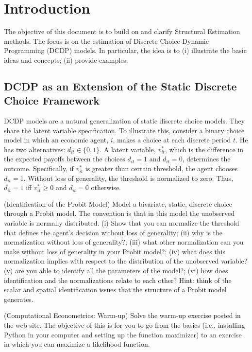 \section{Introduction} \label{section:intro}
\noindent The objective of this document is to build on \citet{keane2011structural} and clarify Structural Estimation methods. The focus is on the estimation of Discrete Choice Dynamic Programming (DCDP) models. In particular, the idea is to (i) illustrate the basic ideas and concepts; (ii) provide examples.\\

\subsection{DCDP as an Extension of the Static Discrete Choice Framework} \label{section:extension}
DCDP models are a natural generalization of static discrete choice models. They share the latent variable specification. To illustrate this, consider a binary choice model in which an economic agent, $i$, makes a choice at each discrete period $t$. He has two alternatives: $d_{it} \in \{ 0,1\}$. A latent variable, $v_{it}^*$, which is the difference in the expected payoffs between the choices $d_{it} = 1$ and $d_{it} = 0$, determines the outcome. Specifically, if $v_{it}^*$ is greater than certain threshold, the agent chooses $d_{it} = 1$. Without loss of generality, the threshold is normalized to zero. Thus, $d_{it} = 1$ iff $v_{it}^* \geq 0$ and $d_{it} = 0$ otherwise.\\
\begin{exercise} (Identification of the Probit Model) \label{exercise:idenprobit}
Model a bivariate, static, discrete choice through a Probit model. The convention is that in this model the unobserved variable is normally distributed. (i) Show that you can normalize the threshold that defines the agent's decision without loss of generality;  (ii) why is the normalization without loss of generality?; (iii) what other normalization can you make without loss of generality in your Probit model?; (iv) what does this normalization implies with respect to the distribution of the unobserved variable? (v) are you able to identify all the parameters of the model?; (vi) how does identification and the normalizations relate to each other? Hint: think of the scalar and spatial identification issues that the structure of a Probit model generates.
\end{exercise}

\begin{exercise} (Computational Econometrics: Warm-up)
Solve the warm-up exercise posted in the web site. The objective of this is for you to go from the basics (i.e., installing Python in your computer and setting up the function maximizer) to an exercise in which you can maximize a likelihood function.
\end{exercise}

